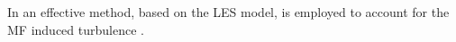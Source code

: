 
In \wisky{} an effective method, based on the \ac{LES} model, 
is employed to account for the \ac{MF} induced 
turbulence \citep{Radice:2017zta,Radice:2020ids}.
%
%
%
%
%
%
%
%
%
%
%

